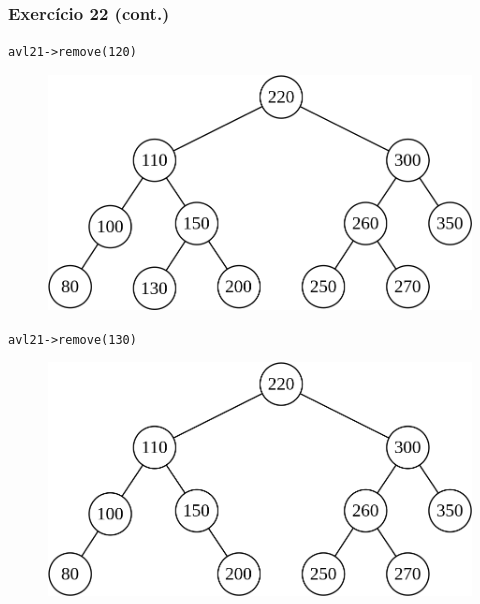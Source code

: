 \documentclass[aspectratio=169]{beamer}
\begin{document}
\begin{frame}[fragile]\frametitle{Exercício 22 (cont.)}
\texttt{avl21-\textgreater{}remove(120)}
\begin{figure}[h]
	\centering
	\includegraphics[height=0.25\paperheight]{imagens/avl-exercicio22d.png}
\end{figure}
\texttt{avl21-\textgreater{}remove(130)}
\begin{figure}[h]
	\centering
	\includegraphics[height=0.25\paperheight]{imagens/avl-exercicio22e.png}
\end{figure}
\end{frame}
\end{document}
